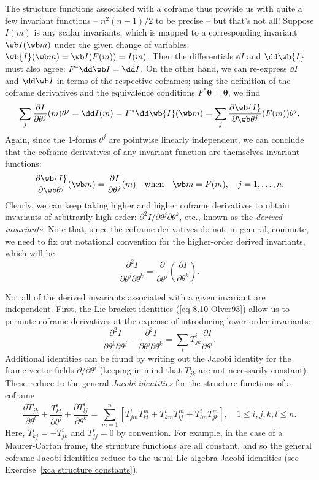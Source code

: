 The structure functions associated with a coframe thus provide us with quite a few invariant functions -- $n^2(n-1)/2$ to be precise -- but that's not all! Suppose $I(m)$ is any scalar invariants, which is mapped to a corresponding invariant $\wb I(\wb m)$ under the given change of variables: $\wb{I}(\wb m)=\wb I(F(m))=I(m)$. Then the differentials $\dd I$ and $\dd \wb{I}$ must also agree: $F^\ast\dd \wb I=\dd I$. On the other hand, we can re-express $\dd I$ and $\dd\wb I$ in terms of the respective coframes; using the definition of the coframe derivatives and the equivalence conditions $F^\ast\bar{\bm\theta}=\bm\theta$, we find 
\[\sum_j \frac{\partial I}{\partial\theta^j}(m)\theta^j=\dd I(m)=F^\ast\dd\wb{I}(\wb m)=\sum_j \frac{\partial \wb{I}}{\partial \wb\theta^j}(F(m))\theta^j.\] 
Again, since the $1$-forms $\theta^j$ are pointwise linearly independent, we can conclude that the coframe derivatives of any invariant function are themselves invariant functions:
\[\frac{\partial \wb{I}}{\partial\wb\theta^j}(\wb m)=\frac{\partial I}{\partial \theta^j}(m)\quad\text{when}\quad \wb m=F(m),\quad j=1,\ldots,n.\]
Clearly, we can keep taking higher and higher coframe derivatives to obtain invariants of arbitrarily high order: $\partial^2 I/\partial\theta^j\partial\theta^k$, etc., known as the \emph{derived invariants}. Note that, since the coframe derivatives do not, in general, commute, we need to fix out notational convention for the higher-order derived invariants, which will be 
\[\frac{\partial^2 I}{\partial\theta^j\partial\theta^k}=\frac{\partial}{\partial\theta^j}\left(\frac{\partial I}{\partial \theta^k}\right).\]

Not all of the derived invariants associated with a given invariant are independent. First, the Lie bracket identities (\ref{eq 8.10 Olver93}) allow us to permute coframe derivatives at the expense of introducing lower-order invariants:
\[\frac{\partial^2 I}{\partial\theta^k\partial\theta^j}-\frac{\partial^2 I}{\partial\theta^j\partial\theta^k}=\sum_i T^i_{jk}\frac{\partial I}{\partial\theta^i}.\]
Additional identities can be found by writing out the Jacobi identity for the frame vector fields $\partial/\partial\theta^i$ (keeping in mind that $T^i_{jk}$ are not necessarily constant). These reduce to the general \emph{Jacobi identities} for the structure functions of a coframe 
\[\frac{\partial T^i_{jk}}{\partial\theta^l}+\frac{T^i_{kl}}{\partial\theta^j}+\frac{\partial T^i_{lj}}{\partial\theta^k}=\sum_{m=1}^n\left[T^i_{jm}T^m_{kl}+T^i_{km}T^m_{lj}+T^i_{lm}T^m_{jk}\right],\quad 1\leq i,j,k,l\leq n.\]
Here, $T^i_{kj}=-T^i_{jk}$ and $T^i_{jj}=0$ by convention. For example, in the case of a Maurer-Cartan frame, the structure functions are all constant, and so the general coframe Jacobi identities reduce to the usual Lie algebra Jacobi identities (see Exercise~\ref{xca structure constants}). 

